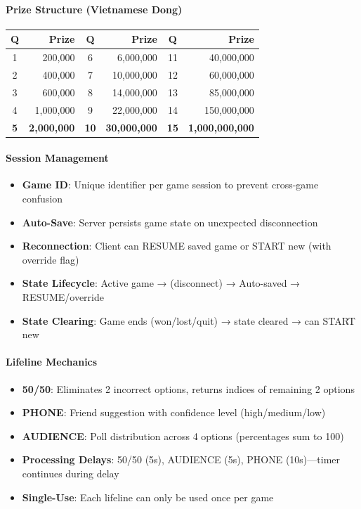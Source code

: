 \paragraph{Prize Structure (Vietnamese Dong)}
\begin{small}
\begin{tabular}{|c|r||c|r||c|r|}
\hline
Q & \textbf{Prize} & Q & \textbf{Prize} & Q & \textbf{Prize} \\
\hline
1 & 200,000 & 6 & 6,000,000 & 11 & 40,000,000 \\
2 & 400,000 & 7 & 10,000,000 & 12 & 60,000,000 \\
3 & 600,000 & 8 & 14,000,000 & 13 & 85,000,000 \\
4 & 1,000,000 & 9 & 22,000,000 & 14 & 150,000,000 \\
\textbf{5} & \textbf{2,000,000} & \textbf{10} & \textbf{30,000,000} & \textbf{15} & \textbf{1,000,000,000} \\
\hline
\end{tabular}
\end{small}

\paragraph{Session Management}
\begin{itemize}
    \item \textbf{Game ID}: Unique identifier per game session to prevent cross-game confusion
    \item \textbf{Auto-Save}: Server persists game state on unexpected disconnection
    \item \textbf{Reconnection}: Client can RESUME saved game or START new (with override flag)
    \item \textbf{State Lifecycle}: Active game → (disconnect) → Auto-saved → RESUME/override
    \item \textbf{State Clearing}: Game ends (won/lost/quit) → state cleared → can START new
\end{itemize}

\paragraph{Lifeline Mechanics}
\begin{itemize}
    \item \textbf{50/50}: Eliminates 2 incorrect options, returns indices of remaining 2 options
    \item \textbf{PHONE}: Friend suggestion with confidence level (high/medium/low)
    \item \textbf{AUDIENCE}: Poll distribution across 4 options (percentages sum to 100)
    \item \textbf{Processing Delays}: 50/50 (5s), AUDIENCE (5s), PHONE (10s)—timer continues during delay
    \item \textbf{Single-Use}: Each lifeline can only be used once per game
\end{itemize}

